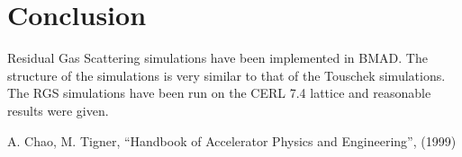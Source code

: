 \documentclass[a4paper,10pt]{article}
\begin{document}
\section{Conclusion}

Residual Gas Scattering simulations have been implemented in BMAD.  The structure of the simulations is very similar to that of the Touschek simulations.  The RGS simulations have been run on the CERL 7.4 lattice and reasonable results were given.

\begin{thebibliography}{1}
 A. Chao, M. Tigner, ``Handbook of Accelerator Physics and Engineering'', (1999)
\end{thebibliography}
\end{document}
